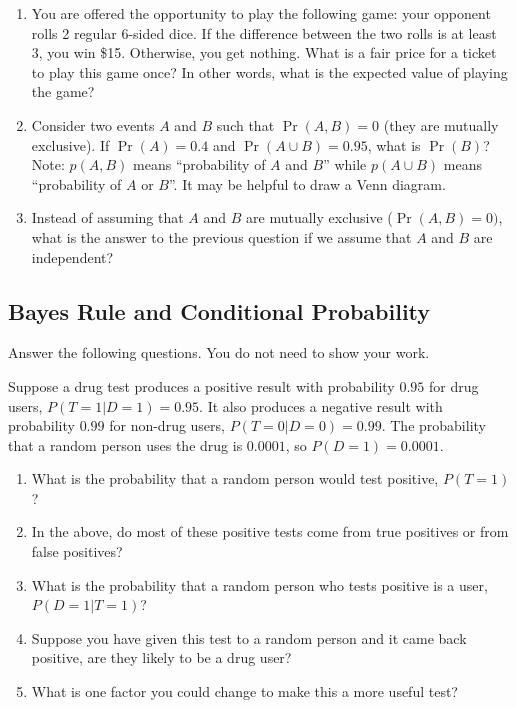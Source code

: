 \documentclass{article}
\def\blu#1{{\color{blu}#1}}
\begin{document}
\begin{enumerate}
\item You are offered the opportunity to play the following game: your opponent rolls 2 regular 6-sided dice. If the difference between the two rolls is at least 3, you win \$15. Otherwise, you get nothing. What is a fair price for a ticket to play this game once? In other words, what is the expected value of playing the game?
\item Consider two events $A$ and $B$ such that $\Pr(A, B)=0$ (they are mutually exclusive). If $\Pr(A) = 0.4$ and $\Pr(A \cup B) = 0.95$, what is $\Pr(B)$? Note: $p(A, B)$ means
``probability of $A$ and $B$'' while $p(A \cup B)$ means ``probability of $A$ or $B$''. It may be helpful to draw a Venn diagram.
\item Instead of assuming that $A$ and $B$ are mutually exclusive ($\Pr(A,B) = 0)$, what is the answer to the previous question if we assume that $A$ and $B$ are independent?
\end{enumerate}

\subsection{Bayes Rule and Conditional Probability}

\blu{Answer the following questions.} You do not need to show your work.

Suppose a drug test produces a positive result with probability $0.95$ for drug users, $P(T=1|D=1)=0.95$. It also produces a negative result with probability $0.99$ for non-drug users, $P(T=0|D=0)=0.99$. The probability that a random person uses the drug is $0.0001$, so $P(D=1)=0.0001$. 

\begin{enumerate}
\item What is the probability that a random person would test positive, $P(T=1)$?
\item In the above, do most of these positive tests come from true positives or from false positives? 
\item What is the probability that a random person who tests positive is a user, $P(D=1|T=1)$?
\item Suppose you have given this test to a random person and it came back positive, are they likely to be a drug user?
\item What is one factor you could change to make this a more useful test?
\end{enumerate}
\end{document}
